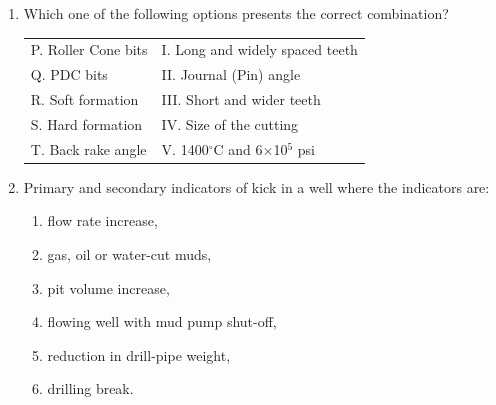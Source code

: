 \documentclass[journal,12pt,onecolumn]{IEEEtran}
\theoremstyle{remark}
\begin{document}
\begin{enumerate}
\begin{enumerate}
\end{enumerate}

\pagebreak

\item Which one of the following options presents the correct combination? 

\hfill{}

\begin{tabular}{ll}
P. Roller Cone bits    & I. Long and widely spaced teeth \\
Q. PDC bits            & II. Journal (Pin) angle \\
R. Soft formation      & III. Short and wider teeth \\
S. Hard formation      & IV. Size of the cutting \\
T. Back rake angle     & V. 1400$^\circ$C and 6$\times$10$^5$ psi \\
\end{tabular}

\begin{enumerate} 
\end{enumerate}

\item Primary and secondary indicators of kick in a well where the indicators are: 

\hfill{}

\begin{enumerate}
\item flow rate increase,
\item gas, oil or water-cut muds,
\item pit volume increase,
\item flowing well with mud pump shut-off,
\item reduction in drill-pipe weight,
\item drilling break.
\end{enumerate}


\end{enumerate}
\end{document}
